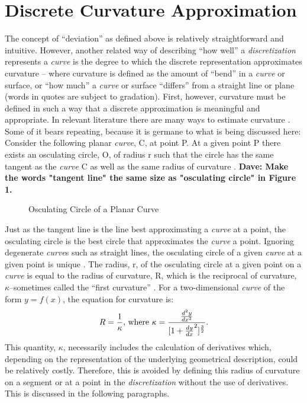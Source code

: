 \section{Discrete Curvature Approximation}
The concept of ``deviation'' as defined above is relatively 
straightforward and intuitive. However, another related way of describing 
``how well'' a \textit{discretization} represents a \textit{curve} is the 
degree to which the discrete representation approximates curvature -- 
where curvature is defined as the amount of ``bend'' in a \textit{curve} 
or surface, or ``how much'' a \textit{curve} or surface ``differs'' from a 
straight line or plane (words in quotes are subject to gradation). First, 
however, curvature must be defined in such a way that a discrete 
approximation is meaningful and appropriate. In relevant literature there 
are many ways to estimate curvature \cite{hermann07}. Some of it bears 
repeating, because it is germane to what is being discussed here: Consider 
the following planar \textit{curve}, C, at point P. At a given point P 
there exists an osculating circle, O, of radius r such that the circle has 
the same tangent as the \textit{curve} C as well as the same radius of 
curvature \cite{gray97}.  {\bf{Dave:  Make the words "tangent line" the 
same size as "osculating circle" in Figure 1.}} \\

\begin{figure}[h!]
  \caption{\label{fig:OsculatingCircle} Osculating Circle of a Planar Curve}
\end{figure}

\noindent Just as the tangent line is the line best approximating a \textit{curve} at a point, the osculating circle is the best circle that approximates the \textit{curve} a point. Ignoring degenerate \textit{curve}s such as straight lines, the osculating circle of a given \textit{curve} at a given point is unique \cite{gray97}. The radius, r, of the osculating circle at a given point on a \textit{curve} is equal to the radius of curvature, R, which is the reciprocal of curvature, $\kappa$--sometimes called the ``first curvature'' \cite{kreyszig91}. For a two-dimensional \textit{curve} of the form $y=f(x)$, the equation for curvature is:
\[ 
R=\frac{1}{\kappa} \textnormal{, where } 
\kappa=\frac{\frac{d^2y}{dx^2}}{[1+\frac{dy}{dx}^2 ]^\frac{3}{2}}. 
\]
\noindent This quantity, $\kappa$, necessarily includes the calculation of 
derivatives which, depending on the representation of the underlying geometrical description, could be relatively costly. Therefore, this is avoided by defining this radius of curvature on a segment or at a point in the \textit{discretization} without the use of derivatives. This is discussed in the following paragraphs.

